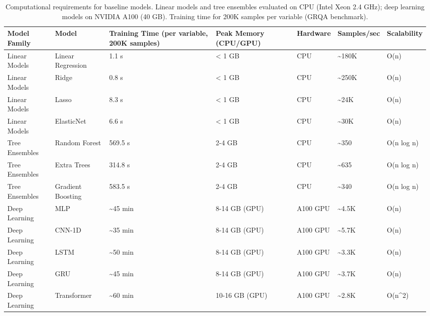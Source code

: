 \begin{table}
\caption{Computational requirements for baseline models. Linear models and tree ensembles evaluated on CPU (Intel Xeon 2.4 GHz); deep learning models on NVIDIA A100 (40 GB). Training time for 200K samples per variable (GRQA benchmark).}
\label{tab:computational}
\begin{tabular}{lllllll}
\toprule
Model Family & Model & Training Time (per variable, 200K samples) & Peak Memory (CPU/GPU) & Hardware & Samples/sec & Scalability \\
\midrule
Linear Models & Linear Regression & 1.1 s & < 1 GB & CPU & \textasciitilde 180K & O(n) \\
Linear Models & Ridge & 0.8 s & < 1 GB & CPU & \textasciitilde 250K & O(n) \\
Linear Models & Lasso & 8.3 s & < 1 GB & CPU & \textasciitilde 24K & O(n) \\
Linear Models & ElasticNet & 6.6 s & < 1 GB & CPU & \textasciitilde 30K & O(n) \\
Tree Ensembles & Random Forest & 569.5 s & 2-4 GB & CPU & \textasciitilde 350 & O(n log n) \\
Tree Ensembles & Extra Trees & 314.8 s & 2-4 GB & CPU & \textasciitilde 635 & O(n log n) \\
Tree Ensembles & Gradient Boosting & 583.5 s & 2-4 GB & CPU & \textasciitilde 340 & O(n log n) \\
Deep Learning & MLP & \textasciitilde 45 min & 8-14 GB (GPU) & A100 GPU & \textasciitilde 4.5K & O(n) \\
Deep Learning & CNN-1D & \textasciitilde 35 min & 8-14 GB (GPU) & A100 GPU & \textasciitilde 5.7K & O(n) \\
Deep Learning & LSTM & \textasciitilde 50 min & 8-14 GB (GPU) & A100 GPU & \textasciitilde 3.3K & O(n) \\
Deep Learning & GRU & \textasciitilde 45 min & 8-14 GB (GPU) & A100 GPU & \textasciitilde 3.7K & O(n) \\
Deep Learning & Transformer & \textasciitilde 60 min & 10-16 GB (GPU) & A100 GPU & \textasciitilde 2.8K & O(n\textasciicircum 2) \\
\bottomrule
\end{tabular}
\end{table}
